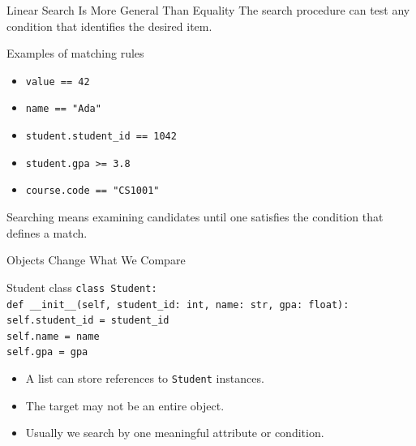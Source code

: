 \documentclass[aspectratio=169,10pt]{beamer}
\begin{document}
\begin{frame}{Linear Search Is More General Than Equality}
  The search procedure can test any condition that identifies the desired item.

  \begin{block}{Examples of matching rules}
    \begin{itemize}
      \item \texttt{value == 42}
      \item \texttt{name == "Ada"}
      \item \texttt{student.student\_id == 1042}
      \item \texttt{student.gpa >= 3.8}
      \item \texttt{course.code == "CS1001"}
    \end{itemize}
  \end{block}

  \begin{keyidea}
    Searching means examining candidates until one satisfies the condition that defines a match.
  \end{keyidea}
\end{frame}


\begin{frame}{Objects Change What We Compare}
  \begin{block}{Student class}
    \texttt{class Student:}\\
    \hspace*{0.20in}\texttt{def \_\_init\_\_(self, student\_id: int, name: str, gpa: float):}\\
    \hspace*{0.40in}\texttt{self.student\_id = student\_id}\\
    \hspace*{0.40in}\texttt{self.name = name}\\
    \hspace*{0.40in}\texttt{self.gpa = gpa}
  \end{block}

  \begin{itemize}
    \item A list can store references to \texttt{Student} instances.
    \item The target may not be an entire object.
    \item Usually we search by one meaningful attribute or condition.
  \end{itemize}
\end{frame}
\end{document}
